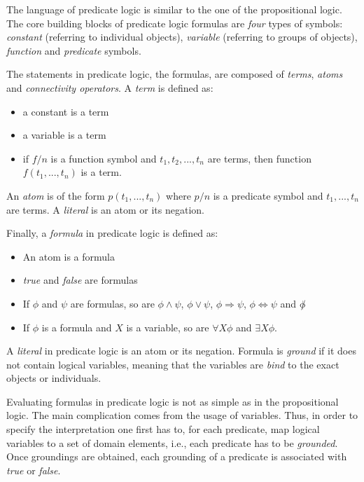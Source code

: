 The language of predicate logic is similar to the one of the propositional logic.
The core building blocks of predicate logic formulas are \textit{four} types of symbols: \textit{constant} (referring to individual objects), \textit{variable} (referring to groups of objects), \textit{function} and \textit{predicate} symbols.


The statements in predicate logic, the formulas, are composed of \textit{terms}, \textit{atoms} and \textit{connectivity operators}.
A \textit{term} is defined as:
\begin{itemize}
	\item a constant is a term
	\item a variable is a term
	\item if $f / n$ is a function symbol and $t_1,t_2,...,t_n$ are terms, then function $f(t_1,...,t_n)$ is a term.
\end{itemize}


An \textit{atom} is of the form $p(t_1,...,t_n)$ where $p/n$ is a predicate symbol and $t_1,...,t_n$ are terms.
A \textit{literal} is an atom or its negation.


Finally, a \textit{formula} in predicate logic is defined as:
\begin{itemize}
	\item An atom is a formula
	\item \textit{true} and \textit{false} are formulas
	\item If $\phi$ and $\psi$ are formulas, so are $\phi \wedge \psi$, $\phi \vee \psi$, $\phi \Rightarrow \psi$, $\phi \Leftrightarrow \psi$ and $\not \phi$
	\item If $\phi$ is a formula and $X$ is a variable, so are $\forall X \phi$ and $\exists X \phi$.
\end{itemize}


A \textit{literal} in predicate logic is an atom or its negation.
Formula is \textit{ground} if it does not contain logical variables, meaning that the variables are \textit{bind} to the exact objects or individuals.







Evaluating formulas in predicate logic is not as simple as in the propositional logic.
The main complication comes from the usage of variables.
Thus, in order to specify the interpretation one first has to, for each predicate,  map logical variables to a set of domain elements, i.e., each predicate has to be \textit{grounded}.
Once groundings are obtained, each grounding of a predicate is associated with \textit{true} or \textit{false}.




